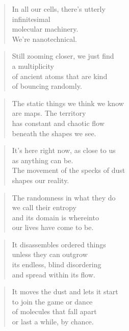\documentclass[10pt,a4paper]{article}
\begin{document}
\begin{paracol}{2}
\begin{verse}
In all our cells, there’s utterly\\
infinitesimal\\
molecular machinery.\\
We’re nanotechnical.
\end{verse}

\begin{verse}
Still zooming closer, we just find\\
a multiplicity\\
of ancient atoms that are kind\\
of bouncing randomly.
\end{verse}

\begin{verse}
The static things we think we know\\
are maps. The territory\\
has constant and chaotic flow\\
beneath the shapes we see.
\end{verse}

\begin{verse}
It’s here right now, as close to us\\
as anything can be.\\
The movement of the specks of dust\\
shapes our reality.
\end{verse}

\begin{verse}
The randomness in what they do\\
we call their entropy\\
and its domain is whereinto\\
our lives have come to be.
\end{verse}

\begin{verse}
It disassembles ordered things\\
unless they can outgrow\\
its endless, blind disordering\\
and spread within its flow.
\end{verse}

\begin{verse}
It moves the dust and lets it start\\
to join the game or dance\\
of molecules that fall apart\\
or last a while, by chance.
\end{verse}


\end{paracol}
\end{document}
